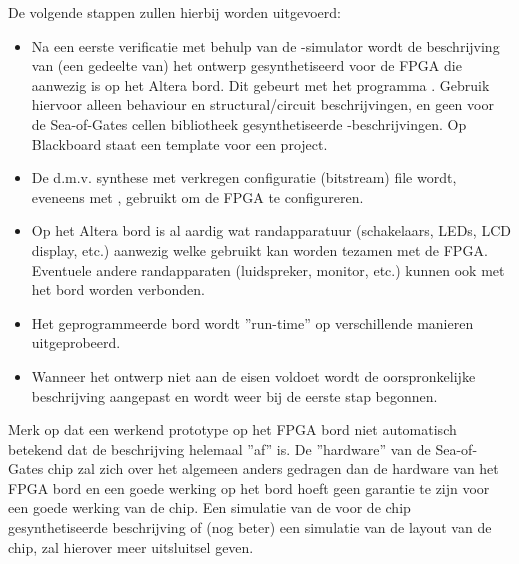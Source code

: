 De volgende stappen zullen hierbij worden uitgevoerd:
\begin{itemize}
\item
Na een eerste verificatie met behulp van de -simulator
wordt de  beschrijving van (een gedeelte van)
het ontwerp gesynthetiseerd voor de FPGA die aanwezig is op het Altera bord.
Dit gebeurt met het programma .
Gebruik hiervoor alleen behaviour en structural/circuit beschrijvingen,
en geen voor de Sea-of-Gates cellen bibliotheek gesynthetiseerde 
-beschrijvingen.
Op Blackboard staat een template voor een  project.
\item
De d.m.v. synthese met  verkregen configuratie 
(bitstream) file wordt, eveneens met ,
gebruikt om de FPGA te configureren.
\item
Op het Altera bord is al aardig wat randapparatuur
(schakelaars, LEDs, LCD display, etc.) aanwezig 
welke gebruikt kan worden tezamen met de FPGA.
Eventuele andere randapparaten
(luidspreker, monitor, etc.) kunnen ook
met het bord worden verbonden.
\item
Het geprogrammeerde bord wordt ''run-time'' op verschillende manieren
uitgeprobeerd.
\item
Wanneer het ontwerp niet aan de eisen voldoet
wordt de oorspronkelijke  beschrijving aangepast
en wordt weer bij de eerste stap begonnen.
\end{itemize}
Merk op dat een werkend prototype op het FPGA bord niet automatisch betekend
dat de  beschrijving helemaal ''af'' is.
De ''hardware'' van de Sea-of-Gates chip zal zich over het algemeen anders gedragen
dan de hardware van het FPGA bord en een goede werking op het bord hoeft geen garantie
te zijn voor een goede werking van de chip.
Een simulatie van de voor de chip gesynthetiseerde  beschrijving
of (nog beter) een simulatie van de layout van de chip, zal 
hierover meer uitsluitsel geven.

\cleardoublepage


